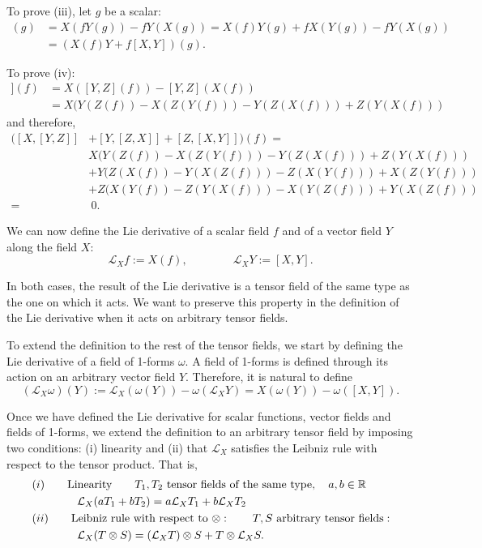 \begin{points}
\item To prove (iii), let $g$ be a scalar:
\begin{align*}
  [X,fY](g)&=X(fY(g))-fY(X(g))=X(f)Y(g)+fX(Y(g))-fY(X(g))\\
  &=(X(f)Y+f[X,Y])(g).
\end{align*}

\item To prove (iv):
\begin{align*}
  [X,[Y,Z]](f)&=X([Y,Z](f))-[Y,Z](X(f))\\
  &=X(Y(Z(f))-X(Z(Y(f)))-Y(Z(X(f)))+Z(Y(X(f)))
\end{align*}
and therefore,
\begin{align*}
  ([X,[Y,Z]]&+[Y,[Z,X]]+[Z,[X,Y]])(f)=\\
  &X(Y(Z(f))-X(Z(Y(f)))-Y(Z(X(f)))+Z(Y(X(f)))\\
  &+Y(Z(X(f))-Y(X(Z(f)))-Z(X(Y(f)))+X(Z(Y(f)))\\
  &+Z(X(Y(f))-Z(Y(X(f)))-X(Y(Z(f)))+Y(X(Z(f)))\\
  =&\ 0.
\end{align*}

\item We can now define the Lie derivative of a scalar field $f$ and of a vector field $Y$ along the field $X$:
\[
  \mathcal L_Xf:=X(f),\qquad\qquad\mathcal L_XY:=[X,Y].
\]

\item In both cases, the result of the Lie derivative is a tensor field of the same type as the one on which it acts. We want to preserve this property in the definition of the Lie derivative when it acts on arbitrary tensor fields.

\item To extend the definition to the rest of the tensor fields, we start by defining the Lie derivative of a field of 1-forms $\omega$. A field of 1-forms is defined through its action on an arbitrary vector field $Y$. Therefore, it is natural to define
\[
  (\mathcal L_X\omega)(Y):=\mathcal L_X(\omega(Y))-\omega(\mathcal L_XY)=X(\omega(Y))-\omega([X,Y]).
\]

\item Once we have defined the Lie derivative for scalar functions, vector fields and fields of 1-forms, we extend the definition to an arbitrary tensor field by imposing two conditions: (i) linearity and (ii) that $\mathcal L_X$ satisfies the Leibniz rule with respect to the tensor product. That is,
\begin{align}
  &(i)\qquad\text{Linearity}\qquad T_1,T_2\text{ tensor fields of the same type},\quad a,b\in\mathbb{R}\nonumber\\
  &\qquad\qquad\mathcal L_X(aT_1+bT_2)=a\mathcal L_XT_1+b\mathcal L_XT_2\\
  &(ii)\qquad\text{Leibniz rule with respect to }\otimes:\qquad T,S\text{ arbitrary tensor fields}:\nonumber\\
  &\qquad\qquad\mathcal L_X(T\otimes S)=(\mathcal L_XT)\otimes S+T\otimes\mathcal L_XS.
\end{align}


\end{points}
